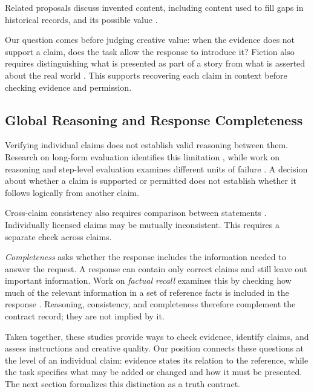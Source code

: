 \documentclass{clv2025}
\begin{document}
Related proposals discuss invented content, including content used to fill
gaps in historical records, and its possible value
\citep{sui_confabulation_2024,sui_critical_2025,yang_hicbench_2025}.

Our question comes before judging creative value: when the evidence does not
support a claim, does the task allow the response to introduce it? Fiction
also requires distinguishing what is presented as part of a story from what
is asserted about the real world \citep{searle_logical_1975}. This supports
recovering each claim in context before checking evidence and permission.

\subsection{Global Reasoning and Response Completeness}\label{subsec:global}

Verifying individual claims does not establish valid reasoning between them.
Research on long-form evaluation identifies this limitation
\citep{yan_logicscore_2026}, while work on reasoning and step-level evaluation
examines different units of failure
\citep{arcuschin_cot_2025,pham_grace_2026}.
A decision about whether a claim is supported or permitted does not
establish whether it follows logically from another claim.

Cross-claim consistency also requires comparison between statements
\citep{mundler_selfcontradictory_2024}. Individually licensed claims may be
mutually inconsistent. This requires a separate check across claims.

\emph{Completeness} asks whether the response includes the information
needed to answer the request. A response can contain only correct claims
and still leave out important information. Work on \emph{factual recall}
examines this by checking how much of the relevant information in a set of
reference facts is included in the response
\citep{liu_verifact_2025,jafari_recall_2026}.
Reasoning, consistency, and completeness therefore complement the contract
record; they are not implied by it.

Taken together, these studies provide ways to check evidence, identify claims,
and assess instructions and creative quality. Our position connects these
questions at the level of an individual claim: evidence states its
relation to the reference, while the task specifies what may be added or
changed and how it must be presented. The next section formalizes this
distinction as a truth contract.
\end{document}
